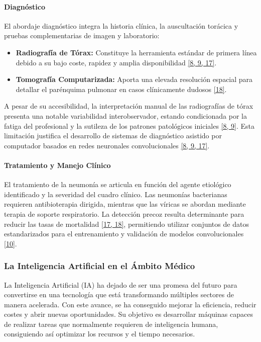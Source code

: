 \documentclass[11pt, a4paper]{article}
\numberwithin{equation}{section}
\begin{document}
\paragraph{Diagnóstico}

El abordaje diagnóstico integra la historia clínica, la auscultación torácica y pruebas complementarias de imagen y laboratorio:

\begin{itemize}
\item \textbf{Radiografía de Tórax:} Constituye la herramienta estándar de primera línea debido a su bajo coste, rapidez y amplia disponibilidad \hyperlink{ref:8}{[8, 9, 17]}.
\item \textbf{Tomografía Computarizada:} Aporta una elevada resolución espacial para detallar el parénquima pulmonar en casos clínicamente dudosos \hyperlink{ref:18}{[18]}.
\end{itemize}

A pesar de su accesibilidad, la interpretación manual de las radiografías de tórax presenta una notable variabilidad interobservador, estando condicionada por la fatiga del profesional y la sutileza de los patrones patológicos iniciales \hyperlink{ref:8}{[8, 9]}. Esta limitación justifica el desarrollo de sistemas de diagnóstico asistido por computador basados en redes neuronales convolucionales \hyperlink{ref:8}{[8, 9, 17]}.

\paragraph{Tratamiento y Manejo Clínico}

El tratamiento de la neumonía se articula en función del agente etiológico identificado y la severidad del cuadro clínico. Las neumonías bacterianas requieren antibioterapia dirigida, mientras que las víricas se abordan mediante terapia de soporte respiratorio. La detección precoz resulta determinante para reducir las tasas de mortalidad \hyperlink{ref:17}{[17, 18]}, permitiendo utilizar conjuntos de datos estandarizados para el entrenamiento y validación de modelos convolucionales \hyperlink{ref:10}{[10]}.

\subsubsection{La Inteligencia Artificial en el Ámbito Médico}

La Inteligencia Artificial (IA) ha dejado de ser una promesa del futuro para convertirse en una tecnología que está transformando múltiples sectores de manera acelerada. Con este avance, se ha conseguido mejorar la eficiencia, reducir costes y abrir nuevas oportunidades. Su objetivo es desarrollar máquinas capaces de realizar tareas que normalmente requieren de inteligencia humana, consiguiendo así optimizar los recursos y el tiempo necesarios.
\end{document}
